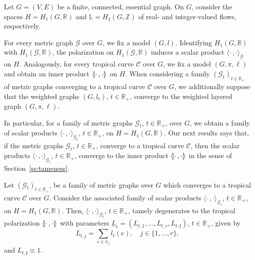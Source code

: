 \documentclass[AHL,Unicode,longabstracts]{cedram}
\newcommand{\innone}[2]{{\langle#2\rangle_{#1}}}
\newcommand{\llangle}{\mathopen{\langle\mkern -3.1mu\lvert}}
\newcommand{\rrangle}{\mathclose{\rvert\mkern -3.1mu\rangle}}
\newcommand{\highinn}[2]{{\llangle#2\rrangle_{#1}}}
\newcommand{\R}{\mathbb{R}}
\newcommand{\Z}{\mathbb{Z}}
\renewcommand{\L}{\mathbb{L}}
\newcommand{\mgr}{\mathcal{G}}
\newcommand{\curve}{\mathcal{C}}
\newcommand{\fin}{\mathfrak f}
\begin{document}
Let $G = (V,E)$ be a finite, connected, essential graph. On $G$, consider the spaces $H = H_1(G, \R)$ and $\L = H_1(G, \Z)$ of real- and integer-valued flows, respectively.

For every metric graph $\mgr$ over $G$, we fix a model $(G, l)$. Identifying $H_1(G, \R)$ with $H_1(\mgr, \R)$, the polarization on $H_1(\mgr, \R)$ induces a scalar product $\innone{\mgr}{\cdot \,, \cdot}$ on $H$. Analogously, for every tropical curve $\curve$ over $G$, we fix a model $(G, \pi, \ell)$ and obtain an inner product $\highinn{}{\cdot \, ,  \cdot}$ on $H$. When considering a family $(\mgr_t)_{t \in \R_+}$ of metric graphs converging to a tropical curve $\curve$ over $G$, we additionally suppose that the weighted graphs $(G, l_t)$, $t \in \R_+$, converge to the weighted layered graph $(G, \pi, \ell)$.

In particular, for a family of metric graphs $\mgr_t$, $t \in \R_+$, over $G$, we obtain a family of scalar products $\innone{\mgr_t}{\cdot \,, \cdot}$, $t \in \R_+$, on $H = H_1(G, \R)$. Our next results says that, if the metric graphs $\mgr_t$, $t \in \R_+$, converge to a tropical curve $\curve$, then the scalar products $\innone{\mgr_t}{\cdot \,, \cdot}$, $t \in \R_+$, converge to the inner product $\highinn{}{\cdot \,, \cdot }$ in the sense of Section~\ref{ss:tameness}.



\begin{lemm}
Let $(\mgr_t)_{t \in \R_+}$, be a family of metric graphs over $G$ which converges to a tropical curve $\curve$ over $G$. Consider the associated family of scalar products $\innone{\mgr_t}{\cdot \,, \cdot }$, $t \in \R_+$, on $H = H_1(G, \R)$. Then, $\innone{\mgr_t}{\cdot \,, \cdot }$, $t \in \R_+$, tamely degenerates to the tropical polarization $\highinn{}{\cdot \,, \cdot }$ with parameters $\underline L_t = (L_{t,1}, \dots, L_{t, r}, L_{t, \fin})$, $t \in \R_+$, given by
\begin{equation}\label{eq:GraphParameters}
L_{t,j} = \sum_{e \in \pi_j} l_t(e), \quad j \in \{1, \dots, r \},
\end{equation}
and $L_{t, \fin} \equiv 1$.
\end{lemm}
\end{document}
